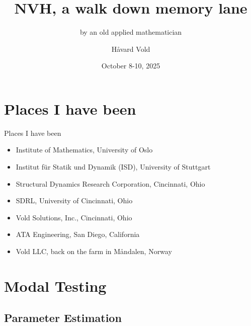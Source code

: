 \documentclass[aspectratio=169,10pt]{beamer} \mode<presentation>
\title{NVH, a walk down memory lane}
\subtitle{by an old applied mathematician}
\author{H\aa vard Vold}
\institute{Vold LLC}
\date{October 8-10, 2025}
\begin{document}
\maketitle

\section[Outline]{}


\section{Places I have been}
\begin{frame}[t]{Places I have been}
  \begin{itemize}[<+->]
    \item Institute of Mathematics, University of Oslo
    \item Institut f\"u{}r Statik und Dynamik (ISD), University of Stuttgart
    \item Structural Dynamics Research Corporation, Cincinnati, Ohio
    \item SDRL, University of Cincinnati, Ohio
      \item Vold Solutions, Inc., Cincinnati, Ohio
    \item ATA Engineering, San Diego, California
    \item Vold LLC, back on the farm in M\aa{}ndalen, Norway
  \end{itemize}
\end{frame}

\section{Modal Testing}

\subsection{Parameter Estimation}
\end{document}
